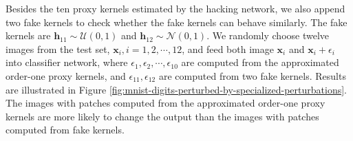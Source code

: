 \documentclass[twoside,11pt]{article}
\def\tvar#1{\mathbf{#1}} %
\begin{document}
Besides the ten proxy kernels estimated by the hacking network, we also append two fake kernels to check whether the fake kernels can behave similarly. The fake kernels are \(\tvar{h}_{11} \sim \mathcal{U}(0, 1)\) and \(\tvar{h}_{12} \sim \mathcal{N}(0, 1)\).
We randomly choose twelve images from the test set, \(\tvar{x}_i, i = 1, 2, \cdots, 12\), and feed both image \(\tvar{x}_i\) and \(\tvar{x}_i + \epsilon_i\) into classifier network, where \(\epsilon_1, \epsilon_2, \cdots, \epsilon_{10}\) are computed from the approximated order-one proxy kernels, and \(\epsilon_{11}, \epsilon_{12}\) are computed from two fake kernels.
Results are illustrated in Figure \ref{fig:mnist-digits-perturbed-by-specialized-perturbations}.
The images with patches computed from the approximated order-one proxy kernels are more likely to change the output than the images with patches computed from fake kernels.
\end{document}
